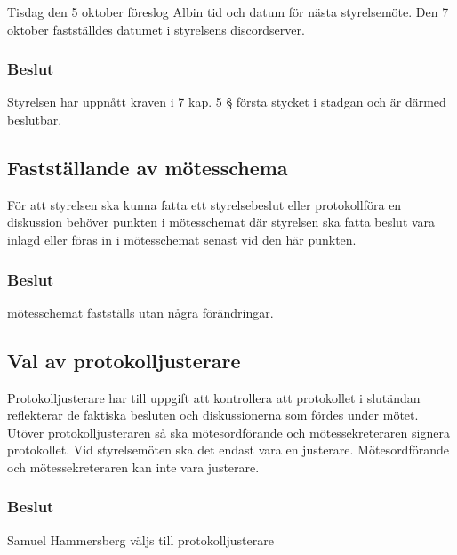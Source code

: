 \documentclass[protokoll]{dvd}
\begin{document}
Tisdag den 5 oktober föreslog Albin tid och datum för nästa styrelsemöte.
Den 7 oktober fastställdes datumet i styrelsens discordserver.

\subsubsection*{Beslut}

\begin{attsatser}
    \item Styrelsen har uppnått kraven i 7 kap. 5 § första stycket i stadgan och är därmed beslutbar.
\end{attsatser}






\subsection{Fastställande av mötesschema}

För att styrelsen ska kunna fatta ett styrelsebeslut eller protokollföra en diskussion behöver punkten i mötesschemat där styrelsen ska fatta beslut vara inlagd eller föras in i mötesschemat senast vid den här punkten.

\subsubsection*{Beslut}

\begin{attsatser}
    \item mötesschemat fastställs utan några förändringar.
\end{attsatser}







\subsection{Val av protokolljusterare}

Protokolljusterare har till uppgift att kontrollera att protokollet i slutändan reflekterar de faktiska besluten och diskussionerna som fördes under mötet.
Utöver protokolljusteraren så ska mötesordförande och mötessekreteraren signera protokollet.
Vid styrelsemöten ska det endast vara en justerare.
Mötesordförande och mötessekreteraren kan inte vara justerare.


\subsubsection*{Beslut}
\begin{attsatser}
    \item Samuel Hammersberg väljs till protokolljusterare
\end{attsatser}
\end{document}

